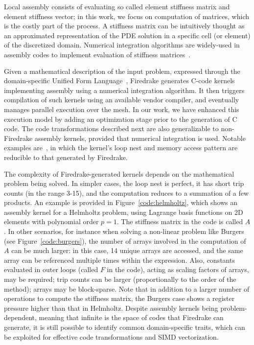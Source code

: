 \documentclass[conference]{IEEEtran}
\begin{document}
Local assembly consists of evaluating so called element stiffness matrix and element stiffness vector; in this work, we focus on computation of matrices, which is the costly part of the process. A stiffness matrix can be intuitively thought as an approximated representation of the PDE solution in a specific cell (or element) of the discretized domain. Numerical integration algorithms are widely-used in assembly codes to implement evaluation of stiffness matrices~\cite{quadrature1, quadrature2}. 

Given a mathematical description of the input problem, expressed through the domain-specific Unified Form Language~\cite{ufl}, Firedrake generates C-code kernels implementing assembly using a numerical integration algorithm. It then triggers compilation of such kernels using an available vendor compiler, and eventually manages parallel execution over the mesh. In our work, we have enhanced this execution model by adding an optimization stage prior to the generation of C code. The code transformations described next are also generalizable to non-Firedrake assembly kernels, provided that numerical integration is used. Notable examples are~\cite{uflacs, fluidity, mcfc}, in which the kernel's loop nest and memory access pattern are reducible to that generated by Firedrake.

The complexity of Firedrake-generated kernels depends on the mathematical problem being solved. In simpler cases, the loop nest is perfect, it has short trip counts (in the range 3-15), and the computation reduces to a summation of a few products. An example is provided in Figure~\ref{code:helmholtz}, which shows an assembly kernel for a Helmholtz problem, using Lagrange basis functions on 2D elements with polynomial order $p=1$. The stiffness matrix in the code is called $A$. In other scenarios, for instance when solving a non-linear problem like Burgers (see Figure~\ref{code:burgers}), the number of arrays involved in the computation of $A$ can be much larger: in this case, 14 unique arrays are accessed, and the same array can be referenced multiple times within the expression. Also, constants evaluated in outer loops (called $F$ in the code), acting as scaling factors of arrays, may be required; trip counts can be larger (proportionally to the order of the method); arrays may be block-sparse. Note that in addition to a larger number of operations to compute the stiffness matrix, the Burgers case shows a register pressure higher than that in Helmholtz. Despite assembly kernels being problem-dependent, meaning that infinite is the space of codes that Firedrake can generate, it is still possible to identify common domain-specific traits, which can be exploited for effective code transformations and SIMD vectorization.
\end{document}
